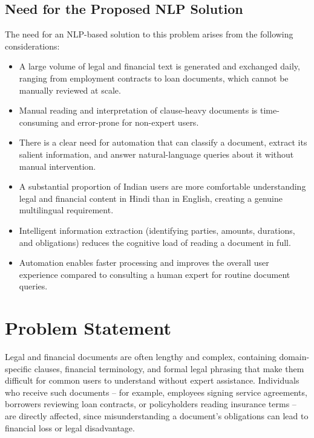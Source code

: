 
\subsection{Need for the Proposed NLP Solution}

The need for an NLP-based solution to this problem arises from the following considerations:

\begin{itemize}
    \item A large volume of legal and financial text is generated and exchanged daily, ranging from employment contracts to loan documents, which cannot be manually reviewed at scale.
    \item Manual reading and interpretation of clause-heavy documents is time-consuming and error-prone for non-expert users.
    \item There is a clear need for automation that can classify a document, extract its salient information, and answer natural-language queries about it without manual intervention.
    \item A substantial proportion of Indian users are more comfortable understanding legal and financial content in Hindi than in English, creating a genuine multilingual requirement.
    \item Intelligent information extraction (identifying parties, amounts, durations, and obligations) reduces the cognitive load of reading a document in full.
    \item Automation enables faster processing and improves the overall user experience compared to consulting a human expert for routine document queries.
\end{itemize}


\section{Problem Statement}

Legal and financial documents are often lengthy and complex, containing domain-specific clauses, financial terminology, and formal legal phrasing that make them difficult for common users to understand without expert assistance. Individuals who receive such documents -- for example, employees signing service agreements, borrowers reviewing loan contracts, or policyholders reading insurance terms -- are directly affected, since misunderstanding a document's obligations can lead to financial loss or legal disadvantage.

